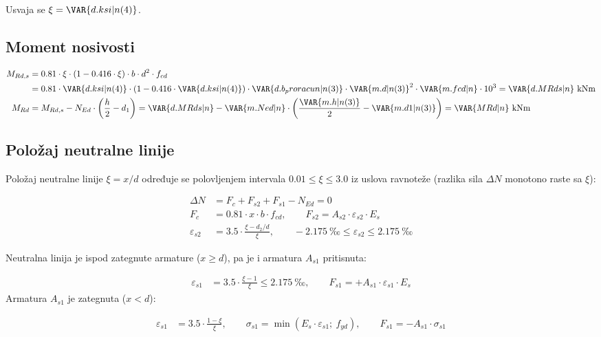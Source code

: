 Usvaja se $\xi = \VAR{d.ksi|n(4)}$.

\subsection{Moment nosivosti}

\begin{align*}
M_{Rd,s} &= 0.81 \cdot \xi \cdot (1 - 0.416 \cdot \xi) \cdot b \cdot d^2 \cdot f_{cd} \\
&= 0.81 \cdot \VAR{d.ksi|n(4)} \cdot (1 - 0.416 \cdot \VAR{d.ksi|n(4)}) \cdot \VAR{d.b_proracun|n(3)} \cdot \VAR{m.d|n(3)}^2 \cdot \VAR{m.fcd|n} \cdot 10^3 = \VAR{d.MRds|n} \ \mathrm{kNm} \\
M_{Rd} &= M_{Rd,s} - N_{Ed} \cdot \left(\frac{h}{2} - d_1\right) = \VAR{d.MRds|n} - \VAR{m.Ned|n} \cdot \left(\frac{\VAR{m.h|n(3)}}{2} - \VAR{m.d1|n(3)}\right) = \VAR{MRd|n} \ \mathrm{kNm}
\end{align*}

\subsection{Položaj neutralne linije}

Položaj neutralne linije $\xi = x/d$ određuje se polovljenjem intervala $0.01 \leq \xi \leq 3.0$ iz uslova ravnoteže (razlika sila $\Delta N$ monotono raste sa $\xi$):

\begin{align*}
\Delta N &= F_c + F_{s2} + F_{s1} - N_{Ed} = 0 \\
F_c &= 0.81 \cdot x \cdot b \cdot f_{cd}, \qquad F_{s2} = A_{s2} \cdot \varepsilon_{s2} \cdot E_s \\
\varepsilon_{s2} &= 3.5 \cdot \frac{\xi - d_2/d}{\xi}, \qquad -2.175 \ \text{‰} \leq \varepsilon_{s2} \leq 2.175 \ \text{‰}
\end{align*}

Neutralna linija je ispod zategnute armature ($x \geq d$), pa je i armatura $A_{s1}$ pritisnuta:

\begin{align*}
\varepsilon_{s1} &= 3.5 \cdot \frac{\xi - 1}{\xi} \leq 2.175 \ \text{‰}, \qquad F_{s1} = + A_{s1} \cdot \varepsilon_{s1} \cdot E_s
\end{align*}
Armatura $A_{s1}$ je zategnuta ($x < d$):

\begin{align*}
\varepsilon_{s1} &= 3.5 \cdot \frac{1 - \xi}{\xi}, \qquad \sigma_{s1} = \min(E_s \cdot \varepsilon_{s1};\ f_{yd}), \qquad F_{s1} = - A_{s1} \cdot \sigma_{s1}
\end{align*}

